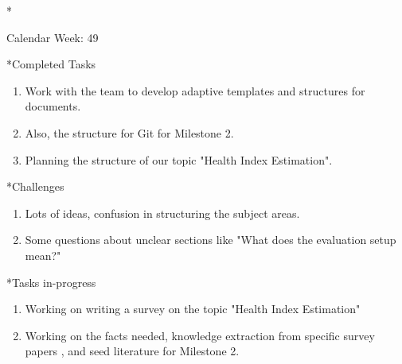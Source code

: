 \documentclass[11pt,a4paper]{article}
\begin{document}
\newpage
\begin{section}*{Calendar Week: 49 \hfill \date{04 December, 2020}}

\begin{subsection}*{Completed Tasks}
    \begin{enumerate}
        \item
            Work with the team to develop adaptive templates and structures for documents.
        \item
            Also, the structure for Git for Milestone 2.
        \item
            Planning the structure of our topic "Health Index Estimation".
    \end{enumerate}
\end{subsection}

\begin{subsection}*{Challenges}
    \begin{enumerate}
        \item
            Lots of ideas, confusion in structuring the subject areas.
        \item
            Some questions about unclear sections like "What does the evaluation setup mean?"
    \end{enumerate}
\end{subsection}

\begin{subsection}*{Tasks in-progress}
    \begin{enumerate}
        \item
            Working on writing a survey on the topic "Health Index Estimation"
        \item
            Working on the facts needed, knowledge extraction from specific survey papers \cite{survey1}\cite{survey2}\cite{survey3}, and seed literature \cite{seed_Literature_1} \cite{seed_Literature_2} for Milestone 2.
    \end{enumerate}
\end{subsection}


\end{section}
\end{document}
